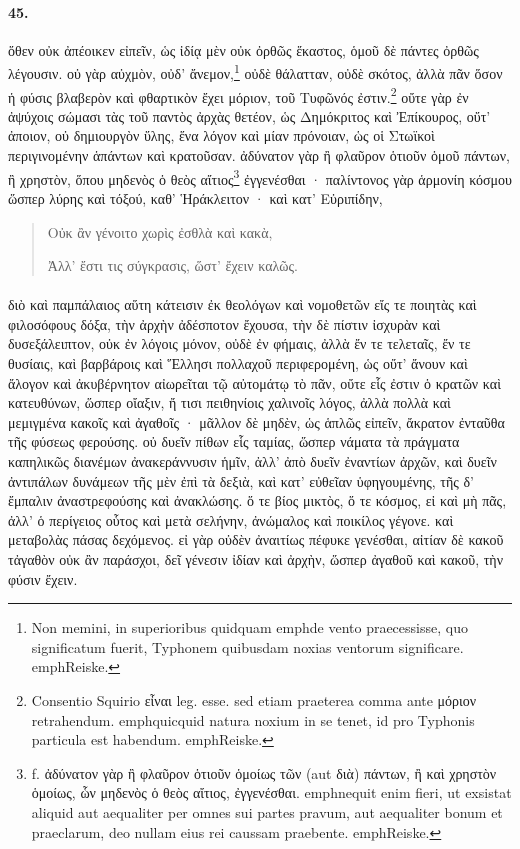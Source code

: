 \documentclass[a4paper, 11pt, oneside, polutonikogreek, german]{article}
\begin{document}
\paragraph{45.}
ὅθεν οὐκ ἀπέοικεν εἰπεῖν, ὡς ἰδίᾳ μὲν οὐκ ὀρθῶς ἕκαστος, ὁμοῦ δὲ πάντες ὀρθῶς λέγουσιν. οὐ γὰρ αὐχμὸν, οὐδ' ἄνεμον,\footnote{Non memini, in superioribus quidquam emph{de vento} praecessisse, quo significatum fuerit, Typhonem quibusdam noxias ventorum significare. emph{Reiske.}} οὐδὲ θάλατταν, οὐδὲ σκότος, ἀλλὰ πᾶν ὅσον ἡ φύσις βλαβερὸν καὶ φθαρτικὸν ἔχει μόριον, τοῦ Τυφῶνός ἐστιν.\footnote{Consentio Squirio εἶναι leg. esse. sed etiam praeterea comma ante μόριον retrahendum. emph{quicquid natura noxium in se tenet, id pro Typhonis particula est habendum.} emph{Reiske.}} οὔτε γὰρ ἐν ἀψύχοις σώμασι τὰς τοῦ παντὸς ἀρχὰς θετέον, ὡς Δημόκριτος καὶ Ἐπίκουρος, οὔτ' ἀποιον, οὐ δημιουργὸν ὕλης, ἕνα λόγον καὶ μίαν πρόνοιαν, ὡς οἱ Στωϊκοὶ περιγινομένην ἁπάντων καὶ κρατοῦσαν. ἀδύνατον γὰρ ἢ φλαῦρον ὁτιοῦν ὁμοῦ πάντων, ἢ χρηστὸν, ὅπου μηδενὸς ὁ θεὸς αἴτιος\footnote{f. ἀδύνατον γὰρ ἢ φλαῦρον ὁτιοῦν ὁμοίως τῶν (aut διὰ) πάντων, ἢ καὶ χρηστὸν ὁμοίως, ὧν μηδενὸς ὁ θεὸς αἴτιος, ἐγγενέσθαι. emph{nequit enim fieri, ut exsistat aliquid aut aequaliter per omnes sui partes pravum, aut aequaliter bonum et praeclarum, deo nullam eius rei caussam praebente.} emph{Reiske.}} ἐγγενέσθαι · παλίντονος γὰρ ἁρμονίη κόσμου ὥσπερ λύρης καὶ τόξού, καθ' Ἡράκλειτον · καὶ κατ' Εὐριπίδην,
\begin{quotation}
Οὐκ ἂν γένοιτο χωρὶς ἐσθλὰ καὶ κακὰ,

Ἀλλ' ἔστι τις σύγκρασις, ὥστ' ἔχειν καλῶς.
\end{quotation}
\paragraph{}
διὸ καὶ παμπάλαιος αὕτη κάτεισιν ἐκ θεολόγων καὶ νομοθετῶν εἴς τε ποιητὰς καὶ φιλοσόφους δόξα, τὴν ἀρχὴν ἀδέσποτον ἔχουσα, τὴν δὲ πίστιν ἰσχυρὰν καὶ δυσεξάλειπτον, οὐκ ἐν λόγοις μόνον, οὐδὲ ἐν φήμαις, ἀλλὰ ἔν τε τελεταῖς, ἔν τε θυσίαις, καὶ βαρβάροις καὶ Ἕλλησι πολλαχοῦ περιφερομένη, ὡς οὔτ' ἄνουν καὶ ἄλογον καὶ ἀκυβέρνητον αἰωρεῖται τῷ αὐτομάτῳ τὸ πᾶν, οὔτε εἷς ἐστιν ὁ κρατῶν καὶ κατευθύνων, ὥσπερ οἴαξιν, ἤ τισι πειθηνίοις χαλινοῖς λόγος, ἀλλὰ πολλὰ καὶ μεμιγμένα κακοῖς καὶ ἀγαθοῖς · μᾶλλον δὲ μηδὲν, ὡς ἁπλῶς εἰπεῖν, ἄκρατον ἐνταῦθα τῆς φύσεως φερούσης. οὐ δυεῖν πίθων εἷς ταμίας, ὥσπερ νάματα τὰ πράγματα καπηλικῶς διανέμων ἀνακεράννυσιν ἡμῖν, ἀλλ' ἀπὸ δυεῖν ἐναντίων ἀρχῶν, καὶ δυεῖν ἀντιπάλων δυνάμεων τῆς μὲν ἐπὶ τὰ δεξιὰ, καὶ κατ' εὐθεῖαν ὑφηγουμένης, τῆς δ' ἔμπαλιν ἀναστρεφούσης καὶ ἀνακλώσης. ὅ τε βίος μικτὸς, ὅ τε κόσμος, εἰ καὶ μὴ πᾶς, ἀλλ' ὁ περίγειος οὗτος καὶ μετὰ σελήνην, ἀνώμαλος καὶ ποικίλος γέγονε. καὶ μεταβολὰς πάσας δεχόμενος. εἰ γὰρ οὐδὲν ἀναιτίως πέφυκε γενέσθαι, αἰτίαν δὲ κακοῦ τἀγαθὸν οὐκ ἂν παράσχοι, δεῖ γένεσιν ἰδίαν καὶ ἀρχὴν, ὥσπερ ἀγαθοῦ καὶ κακοῦ, τὴν φύσιν ἔχειν.
\end{document}
